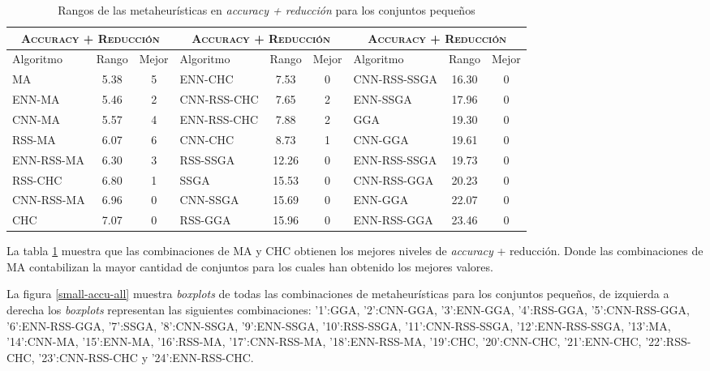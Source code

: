 \begin{table}[h!]
\centering
\begin{adjustbox}{max width =\textwidth}
\begin{tabular}{l c c|l c c|l c c}
\hline
\multicolumn{3}{c|}{\textsc{Accuracy + Reducción}}
	& \multicolumn{3}{c}{\textsc{Accuracy + Reducción}}
	& \multicolumn{3}{c}{\textsc{Accuracy + Reducción}} \\
\hline
Algoritmo & Rango & Mejor & Algoritmo & Rango & Mejor & Algoritmo & Rango & Mejor \\
\hline
\hline


MA           & 5.38  & 5 & ENN-CHC      & 7.53  & 0 & CNN-RSS-SSGA & 16.30 & 0  \\
ENN-MA       & 5.46  & 2 & CNN-RSS-CHC  & 7.65  & 2 & ENN-SSGA     & 17.96 & 0  \\
CNN-MA       & 5.57  & 4 & ENN-RSS-CHC  & 7.88  & 2 & GGA          & 19.30 & 0 \\
RSS-MA       & 6.07  & 6 & CNN-CHC      & 8.73  & 1 & CNN-GGA      & 19.61 & 0  \\
ENN-RSS-MA   & 6.30  & 3 & RSS-SSGA     & 12.26 & 0 & ENN-RSS-SSGA & 19.73 & 0  \\
RSS-CHC      & 6.80  & 1 & SSGA         & 15.53 & 0 & CNN-RSS-GGA  & 20.23 & 0  \\
CNN-RSS-MA   & 6.96  & 0 & CNN-SSGA     & 15.69 & 0 & ENN-GGA      & 22.07 & 0  \\
CHC          & 7.07  & 0 & RSS-GGA      & 15.96 & 0 & ENN-RSS-GGA  & 23.46 & 0 \\ 
 

\hline
\end{tabular}
\end{adjustbox}
\caption{Rangos de las metaheurísticas en \emph{accuracy + reducción} para los conjuntos pequeños}
\label{rank-peq}
\end{table} 

La tabla \ref{rank-peq} muestra que las combinaciones de MA y CHC obtienen los mejores niveles de \emph{accuracy} + reducción. Donde las combinaciones de MA contabilizan la mayor cantidad de conjuntos para los cuales han obtenido los mejores valores.

La figura \ref{small-accu-all}  muestra \emph{boxplots} de todas las combinaciones de metaheurísticas para los conjuntos pequeños, de izquierda a derecha los \emph{boxplots} representan las siguientes combinaciones: '1':GGA, '2':CNN-GGA, '3':ENN-GGA, '4':RSS-GGA, '5':CNN-RSS-GGA, '6':ENN-RSS-GGA, '7':SSGA, '8':CNN-SSGA, '9':ENN-SSGA, '10':RSS-SSGA, '11':CNN-RSS-SSGA, '12':ENN-RSS-SSGA, '13':MA, '14':CNN-MA, '15':ENN-MA, '16':RSS-MA, '17':CNN-RSS-MA, '18':ENN-RSS-MA, '19':CHC, '20':CNN-CHC, '21':ENN-CHC, '22':RSS-CHC, '23':CNN-RSS-CHC y '24':ENN-RSS-CHC.

